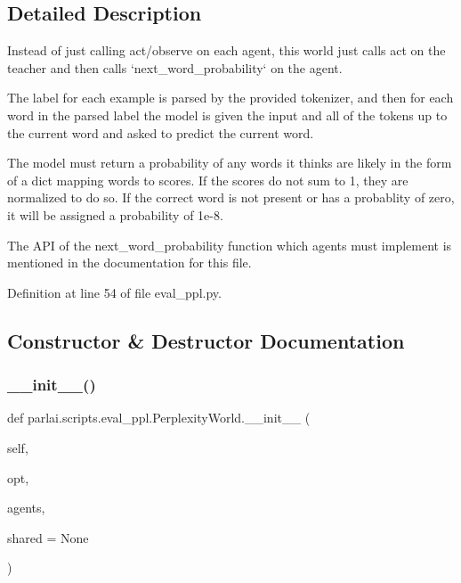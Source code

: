 \subsection{Detailed Description}
\begin{DoxyVerb}Instead of just calling act/observe on each agent, this world just calls
act on the teacher and then calls `next_word_probability` on the agent.

The label for each example is parsed by the provided tokenizer, and then
for each word in the parsed label the model is given the input and all of
the tokens up to the current word and asked to predict the current word.

The model must return a probability of any words it thinks are likely in
the form of a dict mapping words to scores. If the scores do not sum to 1,
they are normalized to do so. If the correct word is not present or has a
probablity of zero, it will be assigned a probability of 1e-8.

The API of the next_word_probability function which agents must implement
is mentioned in the documentation for this file.
\end{DoxyVerb}
 

Definition at line 54 of file eval\+\_\+ppl.\+py.



\subsection{Constructor \& Destructor Documentation}
\mbox{\label{classparlai_1_1scripts_1_1eval__ppl_1_1PerplexityWorld_a28918c916f0ee900c655359388411f84}} 
\subsubsection{\texorpdfstring{\+\_\+\+\_\+init\+\_\+\+\_\+()}{\_\_init\_\_()}}
{\footnotesize\ttfamily def parlai.\+scripts.\+eval\+\_\+ppl.\+Perplexity\+World.\+\_\+\+\_\+init\+\_\+\+\_\+ (\begin{DoxyParamCaption}\item[{}]{self,  }\item[{}]{opt,  }\item[{}]{agents,  }\item[{}]{shared = {\ttfamily None} }\end{DoxyParamCaption})}




